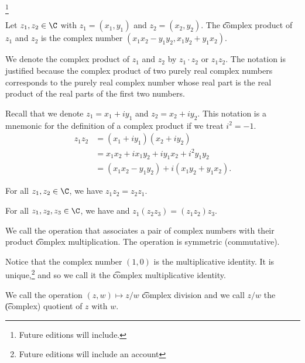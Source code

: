 
\footnote{Future editions will include.}


Let $z_1, z_2 \in \C$ with $z_1 = (x_1, y_1)$ and $z_2 = (x_2, y_2)$.
The \t{complex product} of $z_1$ and $z_2$ is the complex number $(x_1x_2 - y_1y_2, x_1y_2 + y_1x_2)$.


We denote the complex product of $z_1$ and $z_2$ by $z_1 \cdot z_2$ or $z_1z_2$.
The notation is justified because the complex product of two purely real complex numbers corresponds to the purely real complex number whose real part is the real product of the real parts of the first two numbers.

Recall that we denote $z_1 = x_1 + iy_1$ and $z_2 = x_2 + iy_2$.
This notation is a mnemonic for the definition of a complex product if we treat $i^2 = -1$.
\[
\begin{aligned}
	z_1z_2 &= (x_1 + iy_1)(x_2 + iy_2) \\
		   &= x_1x_2 + ix_1y_2 + iy_1x_2 + i^2 y_1y_2 \\
		   &= (x_1x_2 - y_1y_2) + i(x_1y_2 + y_1x_2).
\end{aligned}
\]


\begin{proposition}[Commutativity]
  For all $z_1, z_2 \in \C$, we have $z_1z_2 = z_2z_1$.
\end{proposition}

\begin{proposition}[Associativity]
For all $z_1, z_2, z_3 \in \C$, we have
  and $z_1(z_2z_3) = (z_1z_2)z_3$.
\end{proposition}


We call the operation that associates a pair of complex numbers with their product \t{complex multiplication}.
The operation is symmetric (commutative).


Notice that the complex number $(1, 0)$ is the multiplicative identity.
It is unique,\footnote{Future editions will include an account} and so we call it the \t{complex multiplicative identity.}

We call the operation $(z, w) \mapsto z/w$ \t{complex division} and we call $z/w$ the \t{(complex) quotient} of $z$ with $w$.

\blankpage
